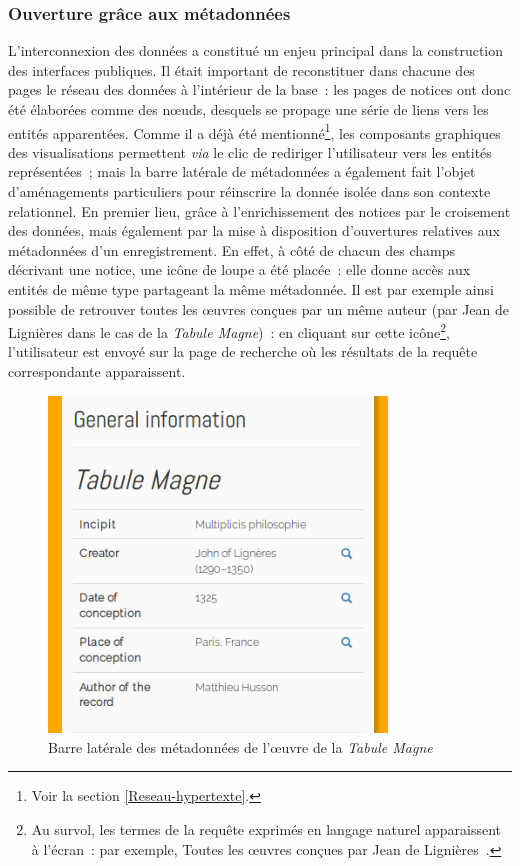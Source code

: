 \documentclass[a4paper,12pt,twoside]{book}
\newcommand{\eng}{\emph}
\newcommand{\g}[1]{\og#1~\fg}
\begin{document}
			\subsubsection{\label{OuvrirMeta}Ouverture grâce aux métadonnées}
L'interconnexion des données a constitué un enjeu principal dans la construction des interfaces publiques. Il était important de reconstituer dans chacune des pages le réseau des données à l'intérieur de la base~: les pages de notices ont donc été élaborées comme des nœuds, desquels se propage une série de liens vers les entités apparentées. Comme il a déjà été mentionné\footnote{Voir la section \ref{Reseau-hypertexte}.}, les composants graphiques des visualisations permettent \eng{via} le clic de rediriger l'utilisateur vers les entités représentées~; mais la barre latérale de métadonnées a également fait l'objet d'aménagements particuliers pour réinscrire la donnée isolée dans son contexte relationnel. En premier lieu, grâce à l'enrichissement des notices par le croisement des données, mais également par la mise à disposition d'ouvertures relatives aux métadonnées d'un enregistrement. En effet, à côté de chacun des champs décrivant une notice, une icône de loupe a été placée~: elle donne accès aux entités de même type partageant la même métadonnée. Il est par exemple ainsi possible de retrouver toutes les œuvres conçues par un même auteur (par Jean de Lignières dans le cas de la \emph{Tabule Magne})~: en cliquant sur cette icône\footnote{Au survol, les termes de la requête exprimés en langage naturel apparaissent à l'écran~: par exemple, \g{Toutes les œuvres conçues par Jean de Lignières}.}, l'utilisateur est envoyé sur la page de recherche où les résultats de la requête correspondante apparaissent.

\begin{figure}[h!]
	\centering
	\includegraphics[width=9cm]{Images/Sidebar/metadata-work.png}
	\caption{Barre latérale des métadonnées de l'œuvre de la \emph{Tabule Magne}}
\end{figure} 
\end{document}
